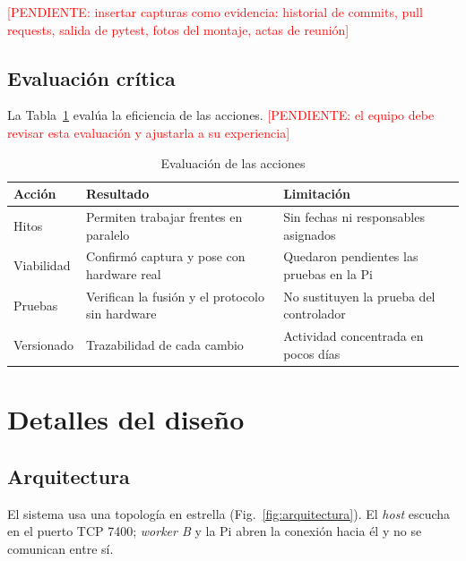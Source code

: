 \documentclass[journal]{IEEEtran}
\newcommand{\pendiente}[1]{\textcolor{red}{[PENDIENTE: #1]}}
\begin{document}
\pendiente{insertar capturas como evidencia: historial de commits, pull requests,
salida de pytest, fotos del montaje, actas de reunión}

\subsection{Evaluación crítica}
La Tabla~\ref{tab:evaluacion} evalúa la eficiencia de las acciones.
\pendiente{el equipo debe revisar esta evaluación y ajustarla a su experiencia}

\begin{table}[!t]
\caption{Evaluación de las acciones}
\label{tab:evaluacion}
\centering
\footnotesize
\begin{tabularx}{\columnwidth}{lXX}
\toprule
\textbf{Acción} & \textbf{Resultado} & \textbf{Limitación}\\
\midrule
Hitos & Permiten trabajar frentes en paralelo & Sin fechas ni responsables asignados\\
Viabilidad & Confirmó captura y pose con hardware real & Quedaron pendientes las pruebas en la Pi\\
Pruebas & Verifican la fusión y el protocolo sin hardware & No sustituyen la prueba del controlador\\
Versionado & Trazabilidad de cada cambio & Actividad concentrada en pocos días\\
\bottomrule
\end{tabularx}
\end{table}

\section{Detalles del diseño}

\subsection{Arquitectura}
El sistema usa una topología en estrella (Fig.~\ref{fig:arquitectura}). El
\emph{host} escucha en el puerto TCP 7400; \emph{worker B} y la Pi abren la
conexión hacia él y no se comunican entre sí.
\end{document}

